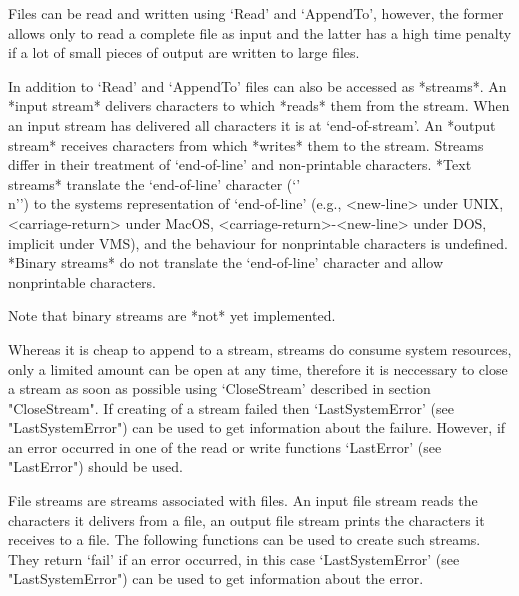 


Files can be read and  written using `Read'  and `AppendTo', however, the
former allows only to read a complete file as {\GAP} input and the latter
has a high time penalty if a lot of small pieces of output are written to
large files.

In addition  to  `Read'  and `AppendTo'  files  can  also be  accessed as
*streams*.  An *input stream* delivers characters to {\GAP} which *reads*
them from the stream.  When an  input stream has delivered all characters
it is  at `end-of-stream'.  An  *output  stream* receives characters from
{\GAP} which *writes* them   to  the stream.    Streams differ in   their
treatment of `end-of-line' and  non-printable characters.  *Text streams*
translate the `end-of-line'     character (`{'\\n'}')  to  the    systems
representation   of   `end-of-line'   (e.g.,    <new-line>  under   UNIX,
<carriage-return> under  MacOS,  <carriage-return>-<new-line> under  DOS,
implicit under VMS), and  the behaviour  for nonprintable characters   is
undefined.  *Binary streams* do not translate the `end-of-line' character
and allow nonprintable characters.

Note that binary streams are *not* yet implemented.

Whereas it   is cheap to append  to  a stream, streams  do consume system
resources, only a limited amount can be open at any time, therefore it is
neccessary  to  close a stream   as soon as possible  using `CloseStream'
described in section "CloseStream".  If  creating of a stream failed then
`LastSystemError' (see "LastSystemError") can  be used to get information
about the failure.  However,  if an error occurred  in one of the read or
write functions `LastError' (see "LastError") should be used.


File streams  are  streams associated with  files.  An  input file stream
reads  the characters  it delivers from  a  file,  an output  file stream
prints the characters it receives to a file.  The following functions can
be used to create such streams.  They return `fail' if an error occurred,
in this case `LastSystemError' (see "LastSystemError") can be used to get
information about the error.

